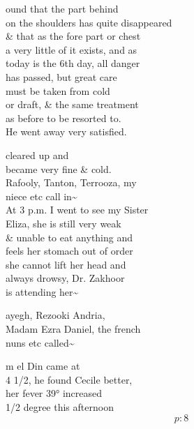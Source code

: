 \documentclass{report}
\begin{document}


	\par{
 	ound that the part behind\ \\on the shoulders has quite disappeared\ \\\& that as the fore part or chest\ \\a very little of it exists, and as\ \\today is the 6th day, all danger\ \\has passed, but great care\ \\must be taken from cold\ \\or draft, \& the same treatment\ \\as before to be resorted to.\ \\He went away very satisfied.\ \\
	}

	\par{
 	cleared up and\ \\became very fine \& cold.\ \\Rafooly, Tanton, Terrooza, my\ \\niece etc call in\~{}\ \\At 3 p.m. I went to see my Sister\ \\Eliza, she is still very weak\ \\\& unable to eat anything and\ \\feels her stomach out of order\ \\she cannot lift her head and\ \\always drowsy, Dr. Zakhoor\ \\is attending her\~{}\ \\
	}

	\par{
 	ayegh, Rezooki Andria,\ \\Madam Ezra Daniel, the french\ \\nuns etc called\~{}\ \\
	}

	\par{
 	m el Din came at\ \\4 1/2, he found Cecile better,\ \\her fever 39° increased\ \\1/2 degree this afternoon\ \\
  \[p: 8 \]

	}


\end{document}
